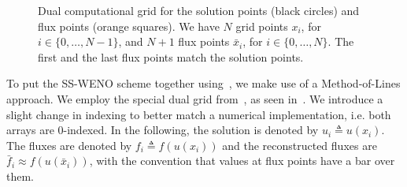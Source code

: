 \documentclass{scrartcl}
\begin{document}
\begin{figure}[H]
\centering
{}
\caption{
    Dual computational grid for the solution points (black circles) and flux points
    (orange squares). We have $N$ grid points $x_i$, for $i \in \{0, \dots, N - 1\}$,
    and $N + 1$ flux points $\bar{x}_i$, for $i \in \{0, \dots, N\}$. The first and
    the last flux points match the solution points.}
\label{fig:weno:grid}
\end{figure}

To put the SS-WENO scheme together using~\cite[Equation 3.42]{Fisher2013}, we
make use of a Method-of-Lines approach. We employ the special dual grid
from~\cite{Fisher2011}, as seen in~. We introduce a slight
change in indexing to better match a numerical implementation, i.e. both arrays
are 0-indexed. In the following, the solution is denoted by $u_i \triangleq u(x_i)$.
The fluxes are denoted by $f_i \triangleq f(u(x_i))$ and the reconstructed
fluxes are $\bar{f}_i \approx f(u(\bar{x}_i))$, with the convention that values
at flux points have a bar over them.
\end{document}
